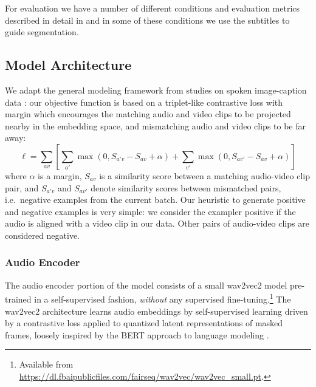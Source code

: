 For evaluation we have a number of different conditions and evaluation
metrics described in detail in  and in some of these
conditions we use the subtitles to guide
segmentation. 



\subsection{Model Architecture}
\label{sec:model}
We adapt the general modeling framework from studies on spoken
image-caption data
\citep{harwath2016unsupervised,chrupala-etal-2017-representations}:
our objective function is based on a triplet-like contrastive loss with margin which
encourages the matching audio and video clips to be projected nearby in
the embedding space, and mismatching audio and video clips to be far
away:
\begin{dmath}
  \ell = \sum_{av}\left[\sum_{a'} \max(0, S_{a'v} - S_{av} +
    \alpha) + \sum_{v'} \max(0, S_{av'} - S_{av} + \alpha) \right]
  \label{eq:triplet}
\end{dmath}
where $\alpha$ is a margin, $S_{av}$ is a similarity score between a
matching audio-video clip pair, and $S_{a'v}$ and $S_{av'}$ denote
similarity scores between mismatched pairs, i.e.\ negative examples
from the current batch. Our heuristic to generate positive and
negative examples is very simple: we consider the exampler
positive if the audio is aligned with a video clip in our
data. Other pairs of audio-video clips are considered negative.

\subsubsection{Audio Encoder}
The audio encoder portion of the model consists of a {\sc small
  wav2vec2} model \citep{wav2vec2} pre-trained in a self-supervised
fashion, \emph{without} any supervised fine-tuning.\footnote{Available from
  \url{https://dl.fbaipublicfiles.com/fairseq/wav2vec/wav2vec_small.pt}.}
The {\sc wav2vec2} architecture learns audio embeddings by
self-supervised learning driven by a contrastive loss applied to 
quantized latent representations of masked frames, loosely inspired by
the BERT approach to language modeling \citep{devlin-etal-2019-bert}.

